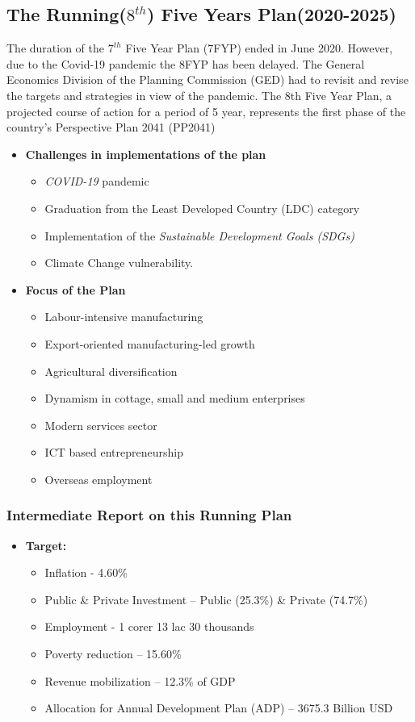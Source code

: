 \subsection{The Running($8^{th}$) Five Years Plan(2020-2025)}
The duration of the $7^{th}$ Five Year Plan (7FYP) ended in June 2020. However, due to the
Covid-19 pandemic the 8FYP has been delayed. The General Economics Division of the
Planning Commission (GED) had to revisit and revise the targets and strategies in view of
the pandemic. The 8th Five Year Plan, a projected course of action for a period of 5 year,
represents the first phase of the country's Perspective Plan 2041 (PP2041)

\begin{itemize}
	\item\textbf{Challenges in implementations of the plan}
	\begin{itemize}
		\item \textit{COVID-19} pandemic
		\item Graduation from the Least Developed Country (LDC) category
		\item Implementation of the \textit{Sustainable Development Goals (SDGs)}
		\item Climate Change vulnerability.
	\end{itemize}
	
	\item\textbf{Focus of the Plan}
	\begin{itemize}
		\item Labour-intensive manufacturing
		\item Export-oriented manufacturing-led growth
		\item Agricultural diversification
		\item Dynamism in cottage, small and medium enterprises
		\item Modern services sector
		\item ICT based entrepreneurship
		\item Overseas employment
	\end{itemize}
\end{itemize}

\subsubsection{Intermediate Report on this Running Plan}
\begin{itemize}
	\item\textbf{Target:}
	\begin{itemize}
		\item Inflation - 4.60\%
		\item Public \& Private Investment – Public (25.3\%) \& Private (74.7\%)
		\item Employment - 1 corer 13 lac 30 thousands
		\item Poverty reduction – 15.60\%
		\item Revenue mobilization – 12.3\% of GDP
		\item Allocation for Annual Development Plan (ADP) – 3675.3 Billion USD
	\end{itemize}
\end{itemize}

